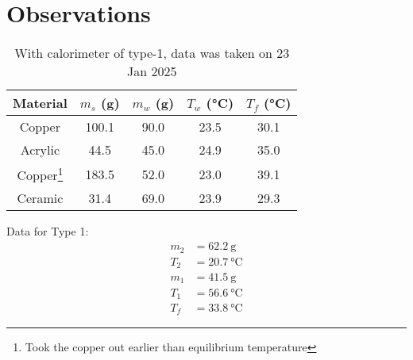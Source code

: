 \documentclass[%
 sor,
 jor,
 amsmath,amssymb,
 reprint,%
]{revtex4-2}
\begin{document}
\section{Observations}



\begin{table}[ht]
\centering
    \begin{minipage}[b]{0.48\hsize}\centering
\begin{tabular}{|c|c|c|c|c|}
\hline
\textbf{Material} & \textbf{$m_s$ (\si{\gram})} & \textbf{$m_w$ (\si{\gram})} & \textbf{$T_w$ (\si{\celsius})} & \textbf{$T_f$ (\si{\celsius})} \\
\hline
Copper & 100.1 & 90.0 & 23.5 & 30.1 \\
Acrylic & 44.5 & 45.0 & 24.9 & 35.0 \\ %
Copper\footnote{Took the copper out earlier than equilibrium temperature} & 183.5 & 52.0 & 23.0 & 39.1 \\ 
Ceramic & 31.4 & 69.0 & 23.9 & 29.3 \\
\hline
\end{tabular}
\caption{With calorimeter of type-1, data was taken on 23 Jan 2025}
\label{tab:table1}
\vspace{0.5cm}Data for Type 1:
\[
\boxed{
\begin{aligned}
m_2 &= 62.2~\si{\gram} \\
T_2 &= 20.7~\si{\celsius} \\
m_1 &= 41.5~\si{\gram} \\
T_1 &= 56.6~\si{\celsius} \\
T_f &= 33.8~\si{\celsius}
\end{aligned}
}
\]


\end{minipage}
\end{table}
\end{document}
